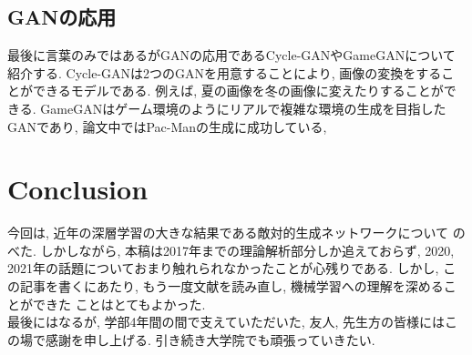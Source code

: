 \subsection{GANの応用}
最後に言葉のみではあるがGANの応用であるCycle-GAN\cite{CGAN}やGameGAN\cite{GGAN}について紹介する. 
Cycle-GANは2つのGANを用意することにより, 画像の変換をすることができるモデルである. 例えば, 
夏の画像を冬の画像に変えたりすることができる. GameGANはゲーム環境のようにリアルで複雑な環境の生成を目指したGANであり,  
論文中ではPac-Manの生成に成功している, 
\section{Conclusion}
今回は, 近年の深層学習の大きな結果である敵対的生成ネットワークについて
のべた. しかしながら, 本稿は2017年までの理論解析部分しか追えておらず, 
2020, 2021年の話題についておまり触れられなかったことが心残りである. しかし, 
この記事を書くにあたり, もう一度文献を読み直し, 機械学習への理解を深めることができた
ことはとてもよかった. \\
\indent 最後にはなるが, 学部4年間の間で支えていただいた, 友人, 先生方の皆様にはこの場で感謝を申し上げる. 
引き続き大学院でも頑張っていきたい. 
